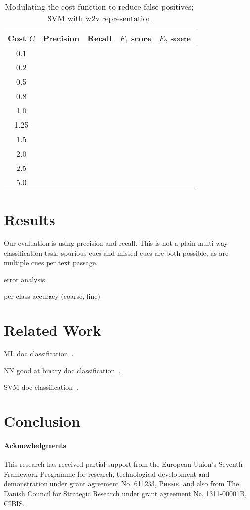 \documentclass[10pt,a4paper]{article}
\begin{document}
\begin{table*}
\centering
\footnotesize
\begin{tabular}{c|cccc}
\hline
{\bf Cost $C$} & {\bf Precision} & {\bf Recall} & {\bf $F_1$ score} & {\bf $F_2$ score} \\
\hline
0.1 &&&& \\
0.2 &&&& \\
0.5 &&&& \\
0.8 &&&& \\
1.0 &&&& \\
1.25 &&&& \\
1.5 &&&& \\
2.0 &&&& \\
2.5 &&&& \\
5.0 &&&& \\
\hline
\end{tabular}
\caption{Modulating the cost function to reduce false positives; SVM with w2v representation}
\label{ref:results-cost}
\end{table*}


\section{Results}

Our evaluation is using precision and recall.
This is not a plain multi-way classification task; spurious cues and missed cues are both possible, as are multiple cues per text passage.

error analysis

per-class accuracy (coarse, fine)


\section{Related Work}

ML doc classification~\cite{sebastiani2002machine}.

NN good at binary doc classification~\cite{derczynski2006machine}.

SVM doc classification~\cite{isa2008text}.


\section{Conclusion}


\paragraph*{Acknowledgments}
This research has received partial support from the European Union’s Seventh Framework Programme for research, technological development and demonstration under grant agreement No. 611233, \textsc{Pheme}, and also from The Danish Council for Strategic Research under grant agreement No. 1311-00001B, \textsc{CIBIS}.

\balance



\end{document}
